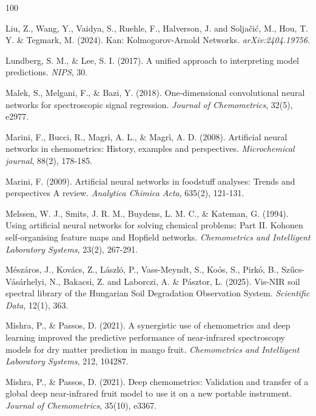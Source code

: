 \documentclass[10pt, a4paper, oneside]{article}
\begin{document}
\begin{thebibliography}{100}
{ Liu, Z., Wang, Y., Vaidya, S., Ruehle, F., Halverson, J. and Solja{\v{c}}i{\'c}, M., Hou, T. Y. \& Tegmark, M. (2024). Kan: Kolmogorov-Arnold Networks. \textit{arXiv:2404.19756}.

 Lundberg, S. M., \& Lee, S. I. (2017). A unified approach to interpreting model predictions. \textit{NIPS}, 30.

 Malek, S., Melgani, F., \& Bazi, Y. (2018). One‐dimensional convolutional neural networks for spectroscopic signal regression. \textit{Journal of Chemometrics}, 32(5), e2977.

 Marini, F., Bucci, R., Magrì, A. L., \& Magrì, A. D. (2008). Artificial neural networks in chemometrics: History, examples and perspectives. \textit{Microchemical journal}, 88(2), 178-185.

 Marini, F. (2009). Artificial neural networks in foodstuff analyses: Trends and perspectives A review. \textit{Analytica Chimica Acta}, 635(2), 121-131.

 Melssen, W. J., Smits, J. R. M., Buydens, L. M. C., \& Kateman, G. (1994). Using artificial neural networks for solving chemical problems: Part II. Kohonen self-organising feature maps and Hopfield networks. \textit{Chemometrics and Intelligent Laboratory Systems}, 23(2), 267-291.

 Mészáros, J., Kovács, Z., László, P., Vass-Meyndt, S., Koós, S., Pirkó, B., Sz{\H{u}}cs-V{\'a}s{\'a}rhelyi, N., Bakacsi, Z. and Laborczi, A. \& Pásztor, L. (2025). Vis-NIR soil spectral library of the Hungarian Soil Degradation Observation System. \textit{Scientific Data}, 12(1), 363.

 Mishra, P., \& Passos, D. (2021). A synergistic use of chemometrics and deep learning improved the predictive performance of near-infrared spectroscopy models for dry matter prediction in mango fruit. \textit{Chemometrics and Intelligent Laboratory Systems}, 212, 104287.

 Mishra, P., \& Passos, D. (2021). Deep chemometrics: Validation and transfer of a global deep near‐infrared fruit model to use it on a new portable instrument. \textit{Journal of Chemometrics}, 35(10), e3367.

}
\end{thebibliography}
\end{document}
